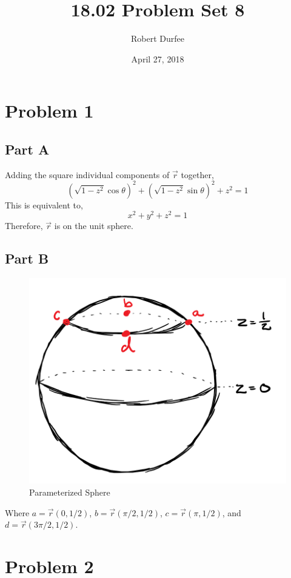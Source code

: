 \documentclass{article}
\title{18.02 Problem Set 8}
\author{Robert Durfee}
\date{April 27, 2018}
\begin{document}
\maketitle

\section*{Problem 1}

\subsection*{Part A}

Adding the square individual components of $\vec{r}$ together,
$$ \left(\sqrt{1 - z^2} \cos \theta \right)^2 + \left(\sqrt{1 - z^2} \sin
\theta\right)^2 + z^2 = 1 $$
This is equivalent to,
$$ x^2 + y^2 + z^2 = 1 $$
Therefore, $\vec{r}$ is on the unit sphere.

\subsection*{Part B}

\begin{figure}[H]
  \centering
  \includegraphics[scale=0.5]{"Sphere"}
  \caption{Parameterized Sphere}
\end{figure}

Where $a = \vec{r}(0,1/2)$, $b = \vec{r}(\pi/2,1/2)$, $c = \vec{r}(\pi, 1/2)$,
and $d = \vec{r}(3\pi/2,1/2)$.

\section*{Problem 2}
\end{document}
